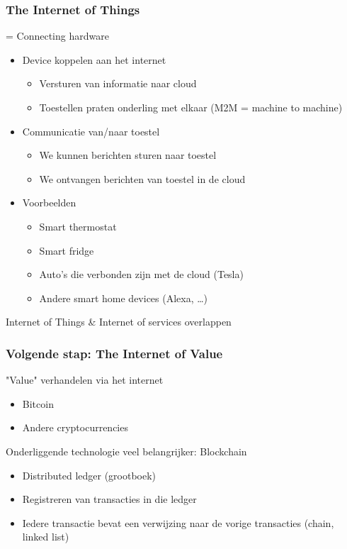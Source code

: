 \documentclass{article}
\begin{document}
\subsubsection{The Internet of Things}
= Connecting hardware

\begin{itemize}
    \item Device koppelen aan het internet
    \begin{itemize}
        \item Versturen van informatie naar cloud
        \item Toestellen praten onderling met elkaar (M2M = machine to machine)
    \end{itemize}
    \item Communicatie van/naar toestel
    \begin{itemize}
        \item We kunnen berichten sturen naar toestel
        \item We ontvangen berichten van toestel in de cloud
    \end{itemize}
    \item Voorbeelden
    \begin{itemize}
        \item Smart thermostat
        \item Smart fridge
        \item Auto's die verbonden zijn met de cloud (Tesla)
        \item Andere smart home devices (Alexa, \dots)
    \end{itemize}
\end{itemize}

Internet of Things \& Internet of services overlappen

\subsubsection{Volgende stap: The Internet of Value}

"Value" verhandelen via het internet

\begin{itemize}
    \item Bitcoin
    \item Andere cryptocurrencies
\end{itemize}

Onderliggende technologie veel belangrijker: Blockchain

\begin{itemize}
    \item Distributed ledger (grootboek)
    \item Registreren van transacties in die ledger
    \item Iedere transactie bevat een verwijzing naar de vorige transacties (chain, linked list)
\end{itemize}
\end{document}
